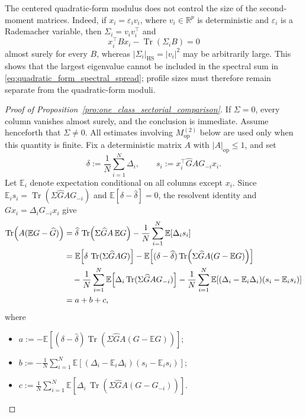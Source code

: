 \documentclass[EJP, preprint, NODS, nobera, nofontexpansion]{ejpecp}
\DeclareMathOperator{\op}{op}
\DeclareMathOperator{\tr}{Tr}
\DeclareMathOperator{\hs}{HS}
\begin{document}
\begin{remark}
The centered quadratic-form modulus does not control the size of the
second-moment matrices.  Indeed, if \(x_i=\varepsilon_i v_i\), where
\(v_i\in\mathbb R^p\) is deterministic and \(\varepsilon_i\)
is a Rademacher variable, then
$\Sigma_i=v_iv_i^{\top}$ and
\[
    x_i^{\top}Bx_i-\tr(\Sigma_iB)=0
\]
almost surely for every $B$, whereas
$|\Sigma_i|_{\hs}=|v_i|^2$ may be arbitrarily large. This shows that the
largest eigenvalue cannot be included in the spectral sum in
\eqref{eq:quadratic_form_spectral_spread}; profile sizes must therefore
remain separate from the quadratic-form moduli.
\end{remark}
\begin{proof}[Proof of Proposition~\ref{pro:one_class_sectorial_comparison}]
If $\Sigma=0$, every column vanishes almost surely, and the conclusion
is immediate. Assume henceforth that $\Sigma\neq0$.
All estimates involving $M_{\op}^{(2)}$ below are used only when this
quantity is finite.
Fix a deterministic matrix $A$ with $|A|_{\op}\leq1$, and set
\[
    \delta:=\frac1N\sum_{i=1}^N\Delta_i,
    \qquad
    s_i:=x_i^\top\widehat GAG_{-i}x_i.
\]
Let $\mathbb E_i$ denote expectation conditional on all columns except
$x_i$. Since $\mathbb E_i s_i=\tr(\Sigma\widehat GAG_{-i})$ and
$\mathbb E[\delta-\widehat\delta]=0$, 
the resolvent identity and $Gx_i=\Delta_iG_{-i}x_i$ give
\begin{align}
    \tr\!\left(A(\mathbb EG-\widehat G)\right)
    &={}
    \widehat\delta\,
    \tr\!\left(\Sigma\widehat GA\,\mathbb EG\right)
    -\frac1N\sum_{i=1}^N\mathbb E[\Delta_i s_i]
    \notag\\
    &={}
    \mathbb E\!\left[
        \delta\,\tr(\Sigma\widehat GAG)
    \right]
    -\mathbb E\!\left[
        (\delta-\widehat\delta)
        \tr\!\left(\Sigma\widehat GA(G-\mathbb EG)\right)
    \right]
    \notag\\
    &\quad-
    \frac1N\sum_{i=1}^N
    \mathbb E\!\left[
        \Delta_i\tr(\Sigma\widehat GAG_{-i})
    \right]
    -\frac1N\sum_{i=1}^N
    \mathbb E\!\left[
        (\Delta_i-\mathbb E_i\Delta_i)
        (s_i-\mathbb E_i s_i)
    \right]
    \notag\\
    &=a+b+c,
\end{align}
where
\begin{itemize}
    \item $\displaystyle
        a:=-\mathbb E\!\left[
            (\delta-\widehat\delta)
            \tr\!\left(\Sigma\widehat GA(G-\mathbb EG)\right)
        \right]$;
    \item $\displaystyle
        b:=-\frac1N\sum_{i=1}^N
        \mathbb E\!\left[
            (\Delta_i-\mathbb E_i\Delta_i)
            (s_i-\mathbb E_i s_i)
        \right]$;
    \item $\displaystyle
        c:=\frac1N\sum_{i=1}^N
        \mathbb E\!\left[
            \Delta_i\,
            \tr\!\left(\Sigma\widehat GA(G-G_{-i})\right)
        \right]$.
\end{itemize}


\end{proof}
\end{document}
